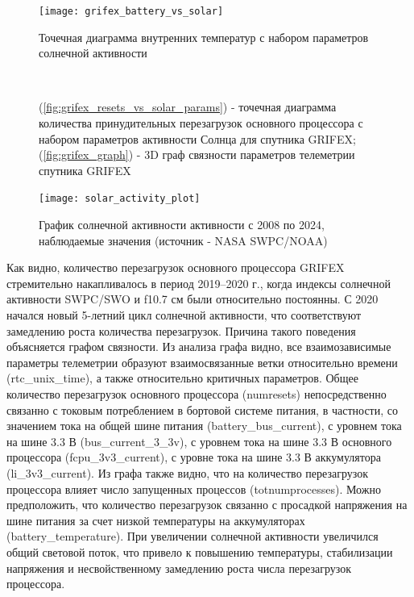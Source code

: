 \documentclass[14pt, a4paper]{../cls/coursework}
\begin{document}
    \begin{figure}[!htbp]
        \centering
        \texttt{[image: grifex\_battery\_vs\_solar]}
        ~\caption{Точечная диаграмма внутренних температур с набором параметров солнечной активности}
        \label{fig:grifex_battery_vs_solar}
    \end{figure}

    \begin{figure}[!htbp]
        \centering
        \hfill
        ~\caption{(\ref{fig:grifex_resets_vs_solar_params}) - точечная диаграмма количества принудительных перезагрузок основного процессора с набором параметров активности Солнца для спутника GRIFEX; (\ref{fig:grifex_graph}) - 3D граф связности параметров телеметрии спутника GRIFEX}
        \label{fig:combined_figure}
    \end{figure}

    \begin{figure}[!htbp]
        \centering
        \texttt{[image: solar\_activity\_plot]}
        ~\caption{График солнечной активности активности с 2008 по 2024, наблюдаемые значения (источник - NASA SWPC/NOAA)}
        \label{fig:solar_activity_plot}
    \end{figure}

    Как видно, количество перезагрузок основного процессора GRIFEX стремительно накапливалось в период 2019–2020 г., когда индексы солнечной активности SWPC/SWO и f10.7 см были относительно постоянны.
    С 2020 начался новый 5-летний цикл солнечной активности, что соответствуют замедлению роста количества перезагрузок.
    Причина такого поведения объясняется графом связности.
    Из анализа графа видно, все взаимозависимые параметры телеметрии образуют взаимосвязанные ветки относительно времени (rtc\_unix\_time), а также относительно критичных параметров.
    Общее количество перезагрузок основного процессора (numresets) непосредственно связанно с токовым потреблением в бортовой системе питания, в частности, со значением тока на общей шине питания (battery\_bus\_current), с уровнем тока на шине 3.3 В (bus\_current\_3\_3v), с уровнем тока на шине 3.3 В основного процессора (fcpu\_3v3\_current), с уровне тока на шине 3.3 В аккумулятора (li\_3v3\_current).
    Из графа также видно, что на количество перезагрузок процессора влияет число запущенных процессов (totnumprocesses).
    Можно предположить, что количество перезагрузок связанно с просадкой напряжения на шине питания за счет низкой температуры на аккумуляторах (battery\_temperature).
    При увеличении солнечной активности увеличился общий световой поток, что привело к повышению температуры, стабилизации напряжения и несвойственному замедлению роста числа перезагрузок процессора.
\end{document}

